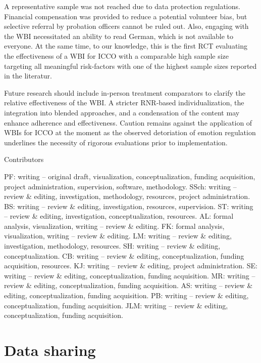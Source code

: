\documentclass[
  super,
  preprint,
  1p,
  onecolumn]{elsarticle}
\begin{document}
A representative sample was not reached due to data protection
regulations. Financial compensation was provided to reduce a potential
volunteer bias, but selective referral by probation officers cannot be
ruled out. Also, engaging with the WBI necessitated an ability to read
German, which is not available to everyone. At the same time, to our
knowledge, this is the first RCT evaluating the effectiveness of a WBI
for ICCO with a comparable high sample size targeting all meaningful
risk-factors with one of the highest sample sizes reported in the
literatur.

Future research should include in-person treatment comparators to
clarify the relative effectiveness of the WBI. A stricter RNR‑based
individualization, the integration into blended approaches, and a
condensation of the content may enhance adherence and effectiveness.
Caution remains against the application of WBIs for ICCO at the moment
as the observed detoriation of emotion regulation underlines the
necessity of rigorous evaluations prior to implementation.

\newpage{}

{Contributors}

PF: writing -- original draft, visualization, conceptualization, funding
acquisition, project administration, supervision, software, methodology.
SSch: writing -- review \& editing, investigation, methodology,
resources, project administration. BS: writing -- review \& editing,
investigation, resources, supervision. ST: writing -- review \& editing,
investigation, conceptualization, resources. AL: formal analysis,
visualization, writing -- review \& editing. FK: formal analysis,
visualization, writing -- review \& editing. LM: writing -- review \&
editing, investigation, methodology, resources. SH: writing -- review \&
editing, conceptualization. CB: writing -- review \& editing,
conceptualization, funding acquisition, resources. KJ: writing -- review
\& editing, project administration. SE: writing -- review \& editing,
conceptualization, funding acquisition. MR: writing -- review \&
editing, conceptualization, funding acquisition. AS: writing -- review
\& editing, conceptualization, funding acquisition. PB: writing --
review \& editing, conceptualization, funding acquisition. JLM: writing
-- review \& editing, conceptualization, funding acquisition.

\section*{Data sharing}\label{data-sharing}
\end{document}
